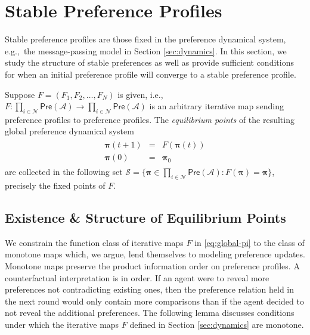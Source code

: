 \documentclass[conference]{ieeeconf}
\newcommand{\N}{\mathcal{N}}
\newcommand{\A}{\mathcal{A}}
\renewcommand{\SS}{\mathcal{S}}
\newcommand{\Pref}{\mathsf{Pre}}
\newcommand{\profile}{\boldsymbol{\pi}}
\begin{document}
\vspace{-0.25em}
\section{Stable Preference Profiles}
\label{sec:stable}
\vspace{-0.25em}

Stable preference profiles are those fixed in the preference dynamical system, e.g.,~the message-passing model in Section \ref{sec:dynamics}. In this section, we study the structure of stable preferences as well as provide sufficient conditions for when an initial preference profile will converge to a stable preference profile.

Suppose $F = (F_1,F_2,\dots,F_N)$ is given, i.e.,~$F: \prod_{i \in \N}  \Pref(\A) \to \prod_{i \in \N}  \Pref(\A)$ is an arbitrary iterative map sending preference profiles to preference profiles. The \emph{equilibrium points} of the resulting global preference dynamical system
\begin{align}
    \begin{aligned}
        \profile(t+1) &=& F\left( \profile(t) \right) \\
        \profile(0) &=& \profile_0
    \end{aligned} \label{eq:global-pi}
\end{align}
are collected in the following set $\SS = \{\profile \in \prod_{i \in \N}  \Pref(\A) : F(\profile) = \profile \}$, precisely the fixed points of $F$.

\vspace{-0.5em}
\subsection{Existence \& Structure of Equilibrium Points}
\vspace{-0.25em}

We constrain the function class of iterative maps $F$ in \eqref{eq:global-pi} to the class of monotone maps which, we argue, lend themselves to modeling preference updates. Monotone maps preserve the product information order on preference profiles. A counterfactual interpretation is in order. If an agent were to reveal more preferences not contradicting existing ones, then the preference relation held in the next round would only contain more comparisons than if the agent decided to not reveal the additional preferences. The following lemma discusses conditions under which the iterative maps $F$ defined in Section \ref{sec:dynamics} are monotone.
\end{document}
